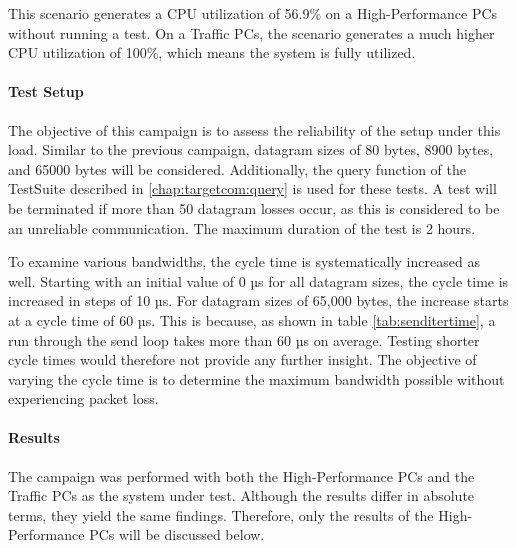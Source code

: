 This scenario generates a \ac{CPU} utilization of 56.9\% on a High-Performance PCs without running a test. On a Traffic PCs, the scenario generates a much higher \ac{CPU} utilization of 100\%, which means the system is fully utilized.

\paragraph{Test Setup}
The objective of this campaign is to assess the reliability of the setup under this load. Similar to the previous campaign, datagram sizes of 80 bytes, 8900 bytes, and 65000 bytes will be considered. Additionally, the query function of the TestSuite described in \ref{chap:targetcom:query} is used for these tests. A test will be terminated if more than 50 datagram losses occur, as this is considered to be an unreliable communication. The maximum duration of the test is 2 hours.

To examine various bandwidths, the cycle time is systematically increased as well. Starting with an initial value of 0 µs for all datagram sizes, the cycle time is increased in steps of 10 µs. For datagram sizes of 65,000 bytes, the increase starts at a cycle time of 60 µs. This is because, as shown in table \ref{tab:senditertime}, a run through the send loop takes more than 60 µs on average. Testing shorter cycle times would therefore not provide any further insight. The objective of varying the cycle time is to determine the maximum bandwidth possible without experiencing packet loss.

\paragraph{Results}
The campaign was performed with both the High-Performance PCs and the Traffic PCs as the system under test. Although the results differ in absolute terms, they yield the same findings. Therefore, only the results of the High-Performance PCs will be discussed below.


